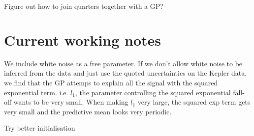 \documentclass[12pt,preprint]{aastex}
\begin{document}
Figure out how to join quarters together with a GP?

\section{Current working notes}

We include white noise as a free parameter.
If we don't allow white noise to be inferred from the data and just use the quoted uncertainties on the Kepler data, we find that the GP attemps to explain all the signal with the squared exponential term.
i.e. $l_1$, the parameter controlling the squared exponential fall-off wants to be very small.
When making $l_1$ very large, the squared exp term gets very small and the predictive mean looks very periodic.

Try better initialisation
\end{document}
